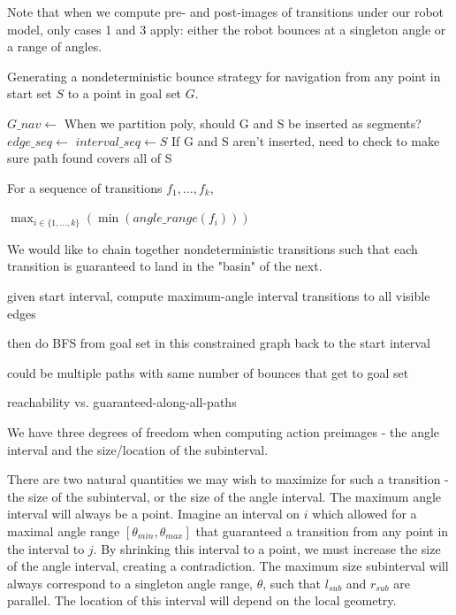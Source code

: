 \documentclass[]{styles/svproc}  %
\begin{document}
Note that when we compute pre- and post-images of transitions under our robot
model, only cases 1 and 3 apply: either the robot bounces at a singleton angle
or a range of angles. 

\begin{algorithm}
\caption{Generating a nondeterministic bounce strategy for navigation from any
point in start set $S$ to a point in goal set $G$.}
\label{algo:nav}
\begin{algorithmic}
\State $G\_nav \gets$ 
\Comment When we partition poly, should G and S be inserted as segments?
\State $edge\_seq \gets$ 
\State $interval\_seq \gets S$
\Comment If G and S aren't inserted, need to check to make sure path found
covers all of S
    \State {}
\EndFor
\EndProcedure
\end{algorithmic}
\end{algorithm}

For a sequence of transitions $f_1, \ldots, f_k$,

$\max_{i \in \{1,\ldots, k\}}( \min(angle\_range(f_i) ))$


We would like to chain together nondeterministic transitions such that each
transition is guaranteed to land in the "basin" of the next.

given start interval, compute maximum-angle interval transitions to all visible
edges

then do BFS from goal set in this constrained graph back to the start interval

could be multiple paths with same number of bounces that get to goal set

reachability vs. guaranteed-along-all-paths

We have three degrees of freedom when computing action preimages - the angle
interval and the size/location of the subinterval.

There are two natural quantities we may wish to maximize for such a transition -
the size of the subinterval, or the size of the angle interval.
The maximum angle interval will always be a point. Imagine an interval on $i$
which allowed for a maximal angle range $[\theta_{min}, \theta_{max}]$ that
guaranteed a transition from any point in the interval to $j$. By
shrinking this interval to a point, we must increase the size of the angle
interval, creating a contradiction. The maximum size subinterval will always correspond to a singleton angle range,
$\theta$, such that $l_{sub}$ and $r_{sub}$ are parallel. The location of this
interval will depend on the local geometry.
\end{document}
